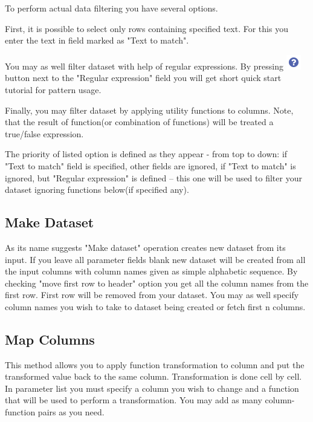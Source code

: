 \documentclass[USenglish]{article}
\begin{document}
To perform actual data filtering you have several options.

First, it is possible to select only rows containing specified text. For this you enter the text in field marked as "Text to match". %

You may as well filter dataset with help of regular expressions. By pressing {\includegraphics[scale=0.6]{tutorial.png}} button next to the "Regular expression" field  you will get short quick start tutorial for pattern usage.

Finally, you may filter dataset by applying utility functions to columns. Note, that the result of function(or combination of functions) will be treated a true/false expression.

The priority of listed option is defined as they appear - from top to down: if "Text to match" field is specified, other fields are ignored, if "Text to match" is ignored, but "Regular expression" is defined -- this one will be used to filter your dataset ignoring functions below(if specified any).
\subsection{Make Dataset}
As its name suggests "Make dataset" operation creates new dataset from its input. If you leave all parameter fields blank new dataset will be created from all the input columns with column names given as simple alphabetic sequence. By checking "move first row to header" option you get all the column names from the first row. First row will be removed from your dataset. You may as well specify column names you wish to take to dataset being created or fetch first n columns.
\subsection{Map Columns}
This method allows you to apply function transformation to column and put the transformed value back to the same column. Transformation is done cell by cell. In parameter list you must specify a column you wish to change and a function that will be used to perform a transformation. You may add as many column-function pairs as you need. 
\end{document}
